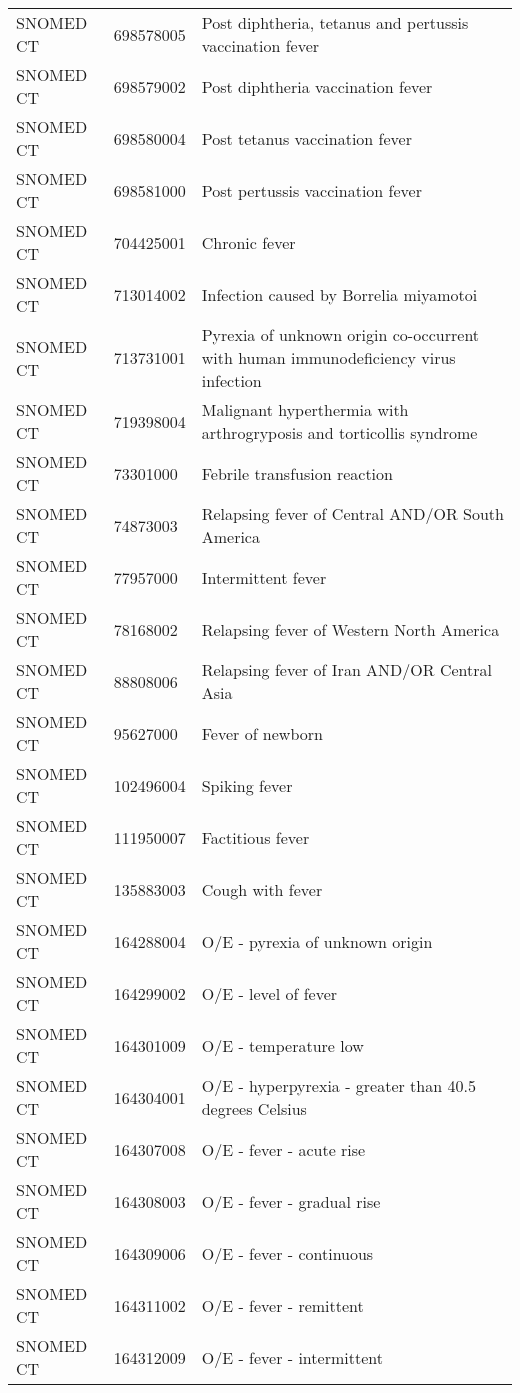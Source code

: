 \begin{longtable}{p{}p{}p{}}
  SNOMED CT & 698578005 & Post diphtheria, tetanus and pertussis vaccination fever \\ 
  SNOMED CT & 698579002 & Post diphtheria vaccination fever \\ 
  SNOMED CT & 698580004 & Post tetanus vaccination fever \\ 
  SNOMED CT & 698581000 & Post pertussis vaccination fever \\ 
  SNOMED CT & 704425001 & Chronic fever \\ 
  SNOMED CT & 713014002 & Infection caused by Borrelia miyamotoi \\ 
  SNOMED CT & 713731001 & Pyrexia of unknown origin co-occurrent with human immunodeficiency virus infection \\ 
  SNOMED CT & 719398004 & Malignant hyperthermia with arthrogryposis and torticollis syndrome \\ 
  SNOMED CT & 73301000 & Febrile transfusion reaction \\ 
  SNOMED CT & 74873003 & Relapsing fever of Central AND/OR South America \\ 
  SNOMED CT & 77957000 & Intermittent fever \\ 
  SNOMED CT & 78168002 & Relapsing fever of Western North America \\ 
  SNOMED CT & 88808006 & Relapsing fever of Iran AND/OR Central Asia \\ 
  SNOMED CT & 95627000 & Fever of newborn \\ 
  SNOMED CT & 102496004 & Spiking fever \\ 
  SNOMED CT & 111950007 & Factitious fever \\ 
  SNOMED CT & 135883003 & Cough with fever \\ 
  SNOMED CT & 164288004 & O/E - pyrexia of unknown origin \\ 
  SNOMED CT & 164299002 & O/E - level of fever \\ 
  SNOMED CT & 164301009 & O/E - temperature low \\ 
  SNOMED CT & 164304001 & O/E - hyperpyrexia - greater than 40.5 degrees Celsius \\ 
  SNOMED CT & 164307008 & O/E - fever - acute rise \\ 
  SNOMED CT & 164308003 & O/E - fever - gradual rise \\ 
  SNOMED CT & 164309006 & O/E - fever - continuous \\ 
  SNOMED CT & 164311002 & O/E - fever - remittent \\ 
  SNOMED CT & 164312009 & O/E - fever - intermittent \\ 

\end{longtable}
